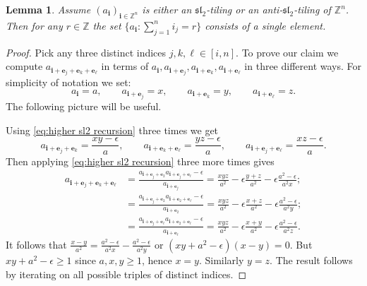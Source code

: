 \documentclass{amsart}
\newtheorem{lemma}[theorem]{Lemma}
\newcommand{\be}{\boldsymbol{e}}
\newcommand{\bi}{\boldsymbol{i}}
\newcommand{\fsl}{\mathfrak{sl}}
\newcommand{\ZZ}{\mathbb{Z}}
\begin{document}
  \begin{lemma}\label{le:constant slices}
    Assume $(a_{\bi})_{\bi\in\ZZ^n}$ is either an $\fsl_2$-tiling or an anti-$\fsl_2$-tiling of $\ZZ^n$.
    Then for any $r\in\ZZ$ the set $\{a_{\bi}: \sum_{j=1}^n i_j=r\}$ consists of a single element.
  \end{lemma}
  \begin{proof}
    Pick any three distinct indices $j,k,\ell\in[i,n]$.
    To prove our claim we compute $a_{\bi+\be_j+\be_k+\be_\ell}$ in terms of $a_{\bi}, a_{\bi+\be_j}, a_{\bi+\be_k}, a_{\bi+\be_\ell}$ in three different ways.
    For simplicity of notation we set:
    \[
      a_{\bi}=a,
      \quad\quad 
      a_{\bi+\be_j}=x,
      \quad\quad 
      a_{\bi+\be_k}=y,
      \quad\quad 
      a_{\bi+\be_\ell}=z.
    \]
    The following picture will be useful.
    \begin{center}
    \end{center}
    Using \eqref{eq:higher sl2 recursion} three times we get
    \[
      a_{\bi+\be_j+\be_k}=\frac{xy-\epsilon}{a},
      \quad\quad 
      a_{\bi+\be_k+\be_\ell}=\frac{yz-\epsilon}{a},
      \quad\quad 
      a_{\bi+\be_j+\be_\ell}=\frac{xz-\epsilon}{a}.
    \]
    Then applying \eqref{eq:higher sl2 recursion} three more times gives
    \begin{align*}
      a_{\bi+\be_j+\be_k+\be_\ell}
      &= \frac{a_{\bi+\be_j+\be_2}a_{\bi+\be_j+\be_\ell}-\epsilon}{a_{\bi+\be_j}}=\frac{xyz}{a^2}-\epsilon\frac{y+z}{a^2}-\epsilon\frac{a^2-\epsilon}{a^2x};\\
      &= \frac{a_{\bi+\be_j+\be_2}a_{\bi+\be_2+\be_\ell}-\epsilon}{a_{\bi+\be_2}}=\frac{xyz}{a^2}-\epsilon\frac{x+z}{a^2}-\epsilon\frac{a^2-\epsilon}{a^2y};\\
      &= \frac{a_{\bi+\be_j+\be_\ell}a_{\bi+\be_2+\be_\ell}-\epsilon}{a_{\bi+\be_\ell}}=\frac{xyz}{a^2}-\epsilon\frac{x+y}{a^2}-\epsilon\frac{a^2-\epsilon}{a^2z}.
    \end{align*}
    It follows that $\frac{x-y}{a^2}=\frac{a^2-\epsilon}{a^2x}-\frac{a^2-\epsilon}{a^2y}$ or $(xy+a^2-\epsilon)(x-y)=0$.  
    But $xy+a^2-\epsilon\ge1$ since $a,x,y\ge1$, hence $x=y$.  
    Similarly $y=z$.
    The result follows by iterating on all possible triples of distinct indices.
  \end{proof}
\end{document}
